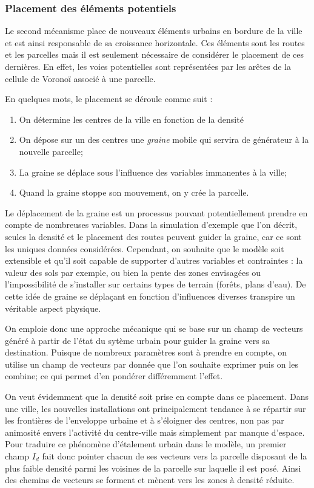 \documentclass[12pt]{article}
\begin{document}
\subsubsection{Placement des éléments potentiels}

Le second mécanisme place de nouveaux éléments urbains en bordure de
la ville et est ainsi responsable de sa croissance horizontale. Ces
éléments sont les routes et les parcelles mais il est seulement
nécessaire de considérer le placement de ces dernières. En effet, les
voies potentielles sont représentées par les arêtes de la cellule de
Voronoï associé à une parcelle.

En quelques mots, le placement se déroule comme suit :

\begin{enumerate}
\item{On détermine les centres de la ville en fonction de la densité}
\item{On dépose sur un des centres une \textit{graine} mobile qui
  servira de générateur à la nouvelle parcelle;}
\item{La graine se déplace sous l'influence des variables immanentes à
  la ville;}
\item{Quand la graine stoppe son mouvement, on y crée la parcelle.}
\end{enumerate}

Le déplacement de la graine est un processus pouvant potentiellement
prendre en compte de nombreuses variables. Dans la simulation
d'exemple que l'on décrit, seules la densité et le placement des
routes peuvent guider la graine, car ce sont les uniques données
considérées. Cependant, on souhaite que le modèle soit extensible et
qu'il soit capable de supporter d'autres variables et contraintes : la
valeur des sols par exemple, ou bien la pente des zones envisagées ou
l'impossibilité de s'installer sur certains types de terrain (forêts,
plans d'eau). De cette idée de graine se déplaçant en fonction
d'influences diverses transpire un véritable aspect physique.

On emploie donc une approche mécanique qui se base sur un champ de
vecteurs généré à partir de l'état du sytème urbain pour guider la
graine vers sa destination. Puisque de nombreux paramètres sont à
prendre en compte, on utilise un champ de vecteurs par donnée que l'on
souhaite exprimer puis on les combine; ce qui permet d'en pondérer
différemment l'effet.

On veut évidemment que la densité soit prise en compte dans ce
placement. Dans une ville, les nouvelles installations ont
principalement tendance à se répartir sur les frontières de
l'enveloppe urbaine et à s'éloigner des centres, non pas par animosité
envers l'activité du centre-ville mais simplement par manque
d'espace. Pour traduire ce phénomène d'étalement urbain dans le
modèle, un premier champ $I_d$ fait donc pointer chacun de ses
vecteurs vers la parcelle disposant de la plus faible densité parmi
les voisines de la parcelle sur laquelle il est posé. Ainsi des
chemins de vecteurs se forment et mènent vers les zones à densité
réduite.
\end{document}
